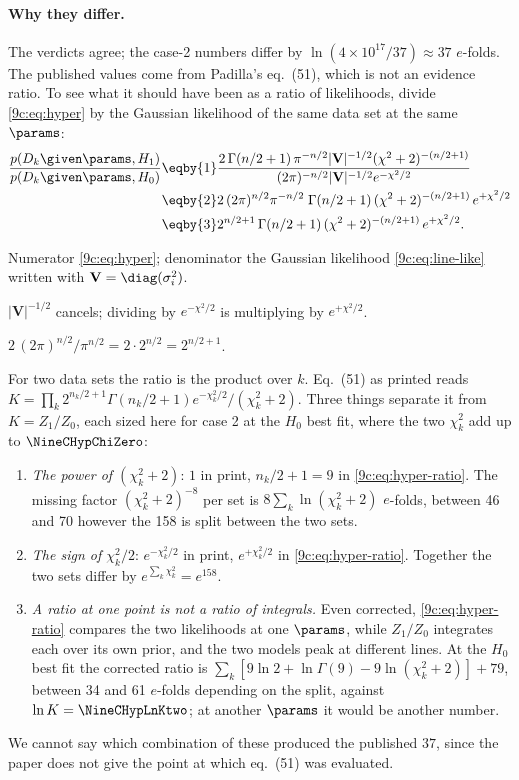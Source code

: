 \paragraph{Why they differ.} The verdicts agree; the case-2 numbers differ by $\ln(4\times10^{17}/37)\approx37$
$e$-folds. The published values come from Padilla's eq.~(51), which is not an evidence ratio. To see what it
should have been as a ratio of likelihoods, divide \eqref{9c:eq:hyper} by the Gaussian likelihood of the same
data set at the same $\params$:
\begin{align}
  \frac{p(D_k\given\params,H_1)}{p(D_k\given\params,H_0)}
  &\eqby{1}\frac{2\,\Gamma(n/2+1)\,\pi^{-n/2}|\mathbf V|^{-1/2}(\chi^2+2)^{-(n/2+1)}}
              {(2\pi)^{-n/2}|\mathbf V|^{-1/2}e^{-\chi^2/2}}
   \nonumber\\
  &\eqby{2}2\,(2\pi)^{n/2}\pi^{-n/2}\;\Gamma(n/2+1)\,(\chi^2+2)^{-(n/2+1)}\,e^{+\chi^2/2}
   \nonumber\\
  &\eqby{3}2^{n/2+1}\,\Gamma(n/2+1)\,(\chi^2+2)^{-(n/2+1)}\,e^{+\chi^2/2}.
  \label{9c:eq:hyper-ratio}
\end{align}
\begin{explain}
  \item Numerator \eqref{9c:eq:hyper}; denominator the Gaussian likelihood \eqref{9c:eq:line-like} written with
        $\mathbf V=\diag(\sigma_i^2)$.
  \item $|\mathbf V|^{-1/2}$ cancels; dividing by $e^{-\chi^2/2}$ is multiplying by $e^{+\chi^2/2}$.
  \item $2\,(2\pi)^{n/2}/\pi^{n/2}=2\cdot2^{n/2}=2^{n/2+1}$.
\end{explain}
For two data sets the ratio is the product over $k$. Eq.~(51) as printed reads
$K=\prod_k2^{n_k/2+1}\Gamma(n_k/2+1)e^{-\chi^2_k/2}/(\chi^2_k+2)$. Three things separate it from $K=Z_1/Z_0$,
each sized here for case 2 at the $H_0$ best fit, where the two $\chi^2_k$ add up to $\NineCHypChiZero$:
\begin{enumerate}[itemsep=1pt]
  \item \emph{The power of $(\chi^2_k+2)$}: $1$ in print, $n_k/2+1=9$ in \eqref{9c:eq:hyper-ratio}. The missing
        factor $(\chi^2_k+2)^{-8}$ per set is $8\sum_k\ln(\chi^2_k+2)$ $e$-folds, between 46 and 70 however the
        158 is split between the two sets.
  \item \emph{The sign of $\chi^2_k/2$}: $e^{-\chi^2_k/2}$ in print, $e^{+\chi^2_k/2}$ in \eqref{9c:eq:hyper-ratio}.
        Together the two sets differ by $e^{\sum_k\chi^2_k}=e^{158}$.
  \item \emph{A ratio at one point is not a ratio of integrals.} Even corrected, \eqref{9c:eq:hyper-ratio}
        compares the two likelihoods at one $\params$, while $Z_1/Z_0$ integrates each over its own prior, and
        the two models peak at different lines. At the $H_0$ best fit the corrected ratio is
        $\sum_k[9\ln2+\ln\Gamma(9)-9\ln(\chi^2_k+2)]+79$, between 34 and 61 $e$-folds depending on the split,
        against $\ln K=\NineCHypLnKtwo$; at another $\params$ it would be another number.
\end{enumerate}
We cannot say which combination of these produced the published $37$, since the paper does not give the point
at which eq.~(51) was evaluated.

